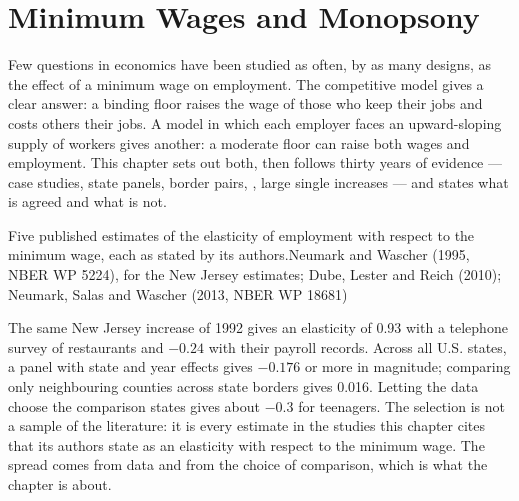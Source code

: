 \chapter{Minimum Wages and Monopsony}\label{ch:b3:minimum-wage}

Few questions in economics have been studied as often, by as many designs, as the
effect of a minimum wage on employment. The competitive model gives a clear answer:
a binding floor raises the wage of those who keep their jobs and costs others their
jobs. A model in which each employer faces an upward-sloping supply of workers
gives another: a moderate floor can raise both wages and employment. This chapter
sets out both, then follows thirty years of evidence --- case studies, state panels,
border pairs, , large single increases --- and states what is
agreed and what is not.

\begin{openingchart}{Five published estimates of the elasticity of employment with
respect to the minimum wage, each as stated by its authors.}{Neumark and Wascher
(1995, NBER WP 5224), for the New Jersey estimates; Dube, Lester and Reich (2010);
Neumark, Salas and Wascher (2013, NBER WP 18681)}
\end{openingchart}

The same New Jersey increase of 1992 gives an elasticity of 0.93 with a telephone survey of
restaurants and $-0.24$ with their payroll records. Across all U.S. states, a panel with
state and year effects gives $-0.176$ or more in magnitude; comparing only neighbouring
counties across state borders gives 0.016. Letting the data choose the comparison
states gives about $-0.3$ for teenagers. The selection is not a sample of the literature:
it is every estimate in the studies this chapter cites that its authors state as an
elasticity with respect to the minimum wage. The spread comes from data and from the
choice of comparison, which is what the chapter is about.

